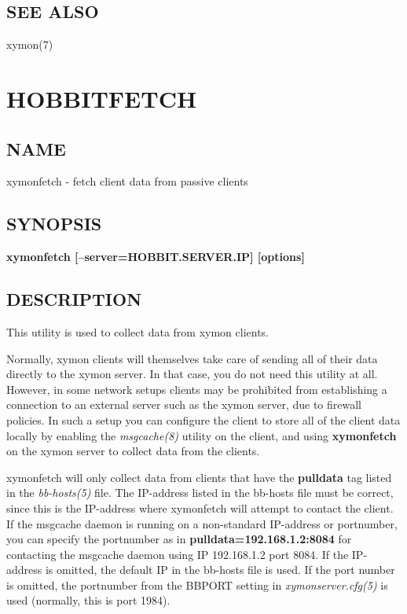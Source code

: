 \subsection{SEE ALSO}
xymon(7) 

 



%
\newpage
\section{HOBBITFETCH}
\subsection{NAME}
 xymonfetch - fetch client data from passive clients \
\subsection{SYNOPSIS}
\textbf{xymonfetch [--server=HOBBIT.SERVER.IP] [options]}


 
\subsection{DESCRIPTION}
 This utility is used to collect data from xymon clients. 

  Normally, xymon clients will themselves take care of sending all of
  their data directly to the xymon server. In that case, you do not
  need this utility at all. However, in some network setups clients
  may be prohibited from establishing a connection to an external
  server such as the xymon server, due to firewall policies. In such
  a setup you can configure the client to store all of the client data
  locally by enabling the \emph{msgcache(8)} utility on the client,
  and using \textbf{xymonfetch} on the xymon server to collect data
  from the clients. 



  xymonfetch will only collect data from clients that have the
  \textbf{pulldata} tag listed in the \emph{bb-hosts(5)} file. The
  IP-address listed in the bb-hosts file must be correct, since this
  is the IP-address where xymonfetch will attempt to contact the
  client. If the msgcache daemon is running on a non-standard
  IP-address or portnumber, you can specify the portnumber as in
  \textbf{pulldata=192.168.1.2:8084} for contacting the msgcache
  daemon using IP 192.168.1.2 port 8084. If the IP-address is omitted,
  the default IP in the bb-hosts file is used. If the port number is
  omitted, the portnumber from the BBPORT setting in
  \emph{xymonserver.cfg(5)} is used (normally, this is port 1984). 




